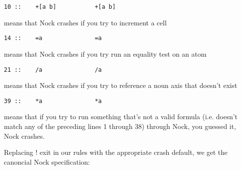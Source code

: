 \begin{framed_shaded}
\begin{Verbatim}[fontsize=\relsize{-2.5},fontseries=b,commandchars=\\\{\}]
10 ::    +[a b]           +[a b]
\end{Verbatim}
\end{framed_shaded}
means that Nock crashes if you try to increment a cell 

\begin{framed_shaded}
\begin{Verbatim}[fontsize=\relsize{-2.5},fontseries=b,commandchars=\\\{\}]
14 ::    =a               =a
\end{Verbatim}
\end{framed_shaded}
means that Nock crashes if you try run an equality test on an atom

\begin{framed_shaded}
\begin{Verbatim}[fontsize=\relsize{-2.5},fontseries=b,commandchars=\\\{\}]
   21 ::    /a               /a
\end{Verbatim}
\end{framed_shaded}
means that Nock crashes if you try to reference a noun axis that doesn't exist

\begin{framed_shaded}
\begin{Verbatim}[fontsize=\relsize{-2.5},fontseries=b,commandchars=\\\{\}]
39 ::    *a               *a
\end{Verbatim}
\end{framed_shaded}
means that if you try to run something that's not a valid formula (i.e. doesn't match any of the preceding lines 1 through 38) through Nock, you guessed it, Nock crashes.

Replacing ! exit in our rules with the appropriate crash default, we get the canoncial Nock specification:

